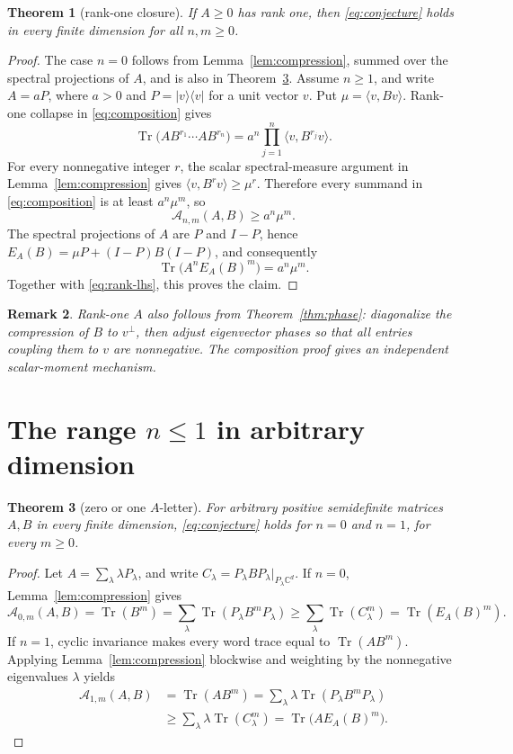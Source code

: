 \documentclass[11pt]{article}
\newtheorem{theorem}{Theorem}[section]
\newtheorem{remark}[theorem]{Remark}
\newcommand{\Tr}{\operatorname{Tr}}
\newcommand{\Aav}{\mathcal A}
\newcommand{\EA}{E_A}
\newcommand{\C}{\mathbb C}
\begin{document}
\begin{theorem}[rank-one closure]\label{thm:rankone}
If \(A\geq0\) has rank one, then \eqref{eq:conjecture} holds in every finite
dimension for all \(n,m\geq0\).
\end{theorem}
\begin{proof}
The case \(n=0\) follows from Lemma~\ref{lem:compression}, summed over the
spectral projections of \(A\), and is also in Theorem~\ref{thm:smalln}.
Assume \(n\geq1\), and write \(A=aP\), where \(a>0\) and
\(P=|v\rangle\langle v|\) for a unit vector \(v\). Put
\(\mu=\langle v,Bv\rangle\). Rank-one collapse in \eqref{eq:composition}
gives
\begin{equation}\label{eq:rankcollapse}
 \Tr\bigl(AB^{r_1}\cdots AB^{r_n}\bigr)
 =a^n\prod_{j=1}^n\langle v,B^{r_j}v\rangle.
\end{equation}
For every nonnegative integer \(r\), the scalar spectral-measure argument in
Lemma~\ref{lem:compression} gives
\(\langle v,B^rv\rangle\geq\mu^r\). Therefore every summand in
\eqref{eq:composition} is at least \(a^n\mu^m\), so
\begin{equation}\label{eq:rank-lhs}
 \Aav_{n,m}(A,B)\geq a^n\mu^m.
\end{equation}
The spectral projections of \(A\) are \(P\) and \(I-P\), hence
\(\EA(B)=\mu P+(I-P)B(I-P)\), and consequently
\[
 \Tr\bigl(A^n\EA(B)^m\bigr)=a^n\mu^m.
\]
Together with \eqref{eq:rank-lhs}, this proves the claim.
\end{proof}
\begin{remark}
Rank-one \(A\) also follows from Theorem~\ref{thm:phase}: diagonalize the
compression of \(B\) to \(v^\perp\), then adjust eigenvector phases so that
all entries coupling them to \(v\) are nonnegative. The composition proof
gives an independent scalar-moment mechanism.
\end{remark}

\section{The range \(n\leq1\) in arbitrary dimension}
\begin{theorem}[zero or one \(A\)-letter]\label{thm:smalln}
For arbitrary positive semidefinite matrices \(A,B\) in every finite
dimension, \eqref{eq:conjecture} holds for \(n=0\) and \(n=1\), for every
\(m\geq0\).
\end{theorem}
\begin{proof}
Let \(A=\sum_\lambda\lambda P_\lambda\), and write
\(C_\lambda=P_\lambda BP_\lambda|_{P_\lambda\C^d}\).
If \(n=0\), Lemma~\ref{lem:compression} gives
\[
 \Aav_{0,m}(A,B)=\Tr(B^m)
 =\sum_\lambda\Tr(P_\lambda B^mP_\lambda)
 \geq\sum_\lambda\Tr(C_\lambda^m)
 =\Tr(\EA(B)^m).
\]
If \(n=1\), cyclic invariance makes every word trace equal to
\(\Tr(AB^m)\). Applying Lemma~\ref{lem:compression} blockwise and weighting
by the nonnegative eigenvalues \(\lambda\) yields
\begin{align*}
 \Aav_{1,m}(A,B)
 &=\Tr(AB^m)
 =\sum_\lambda\lambda\Tr(P_\lambda B^mP_\lambda)\\
 &\geq\sum_\lambda\lambda\Tr(C_\lambda^m)
 =\Tr\bigl(A\EA(B)^m\bigr).
\end{align*}
\end{proof}
\end{document}
